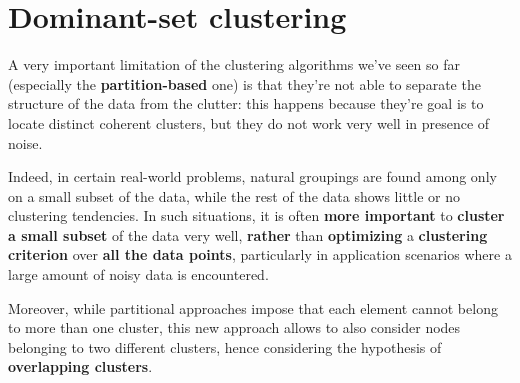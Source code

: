 \section{Dominant-set clustering}
A very important limitation of the clustering algorithms we've seen so far (especially the \textbf{partition-based} one) is that they're not able to separate the structure of the data from the clutter: this happens because they're goal is to locate distinct coherent clusters, but they do not work very well in presence of noise.


Indeed, in certain real-world problems, natural groupings are found among only on a small subset of the data, while the rest of the data shows little or no clustering tendencies. In such situations, it is often \textbf{more important} to \textbf{cluster a small subset} of the data very well, \textbf{rather} than \textbf{optimizing} a \textbf{clustering criterion} over \textbf{all the data points}, particularly in application scenarios where a large amount of noisy data is encountered.

Moreover, while partitional approaches impose that each element cannot belong to more than one cluster, this new approach allows to also consider nodes belonging to two different clusters, hence considering the hypothesis of \textbf{overlapping clusters}.


